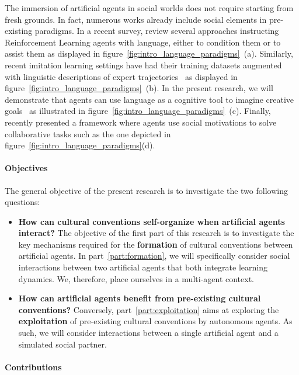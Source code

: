 The immersion of artificial agents in social worlds does not require starting from fresh grounds. In fact, numerous works already include social elements in pre-existing \ai paradigms. In a recent survey, \citet{Luketina2019} review several approaches instructing Reinforcement Learning agents with language, either to condition them or to assist them as displayed in figure~\ref{fig:intro_language_paradigms}~(a). Similarly, recent imitation learning settings have had their training datasets augmented with linguistic descriptions of expert trajectories~\citep{ALFRED20,pashevich2021episodic} as displayed in figure~\ref{fig:intro_language_paradigms}~(b). In the present research, we will demonstrate that agents can use language as a cognitive tool to imagine creative goals~\citep{colas2022language} as illustrated in figure~\ref{fig:intro_language_paradigms}~(c). Finally, \citet{jaques2019social} recently presented a \marl framework where agents use social motivations to solve collaborative tasks such as the one depicted in figure~\ref{fig:intro_language_paradigms}(d). 

\paragraph{Objectives}

The general objective of the present research is to investigate the two following questions: 
\begin{itemize}
	\item \textbf{How can cultural conventions self-organize when artificial agents interact?} The objective of the first part of this research is to investigate the key mechanisms required for the \textbf{formation} of cultural conventions between artificial agents. In part~\ref{part:formation}, we will specifically consider social interactions between two artificial agents that both integrate learning dynamics. We, therefore, place ourselves in a multi-agent context.
	\item \textbf{How can artificial agents benefit from pre-existing cultural conventions?} Conversely, part~\ref{part:exploitation} aims at exploring the \textbf{exploitation} of pre-existing cultural conventions by autonomous agents. As such, we will consider interactions between a single artificial agent and a simulated social partner.
\end{itemize}


\paragraph{Contributions}

